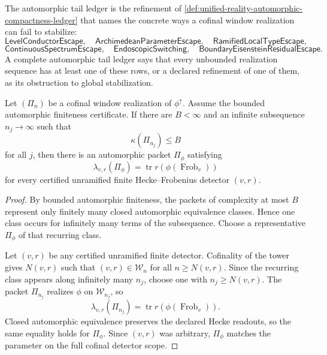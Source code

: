 \begin{definition}
\label{def:unified-reality-automorphic-tail-ledger}
The automorphic tail ledger is the refinement of
\autoref{def:unified-reality-automorphic-compactness-ledger} that names
the concrete ways a cofinal window realization can fail to stabilize:
$$
\mathsf{LevelConductorEscape},\quad
\mathsf{ArchimedeanParameterEscape},\quad
\mathsf{RamifiedLocalTypeEscape},
$$
$$
\mathsf{ContinuousSpectrumEscape},\quad
\mathsf{EndoscopicSwitching},\quad
\mathsf{BoundaryEisensteinResidualEscape}.
$$
A complete automorphic tail ledger says that every unbounded realization
sequence has at least one of these rows, or a declared refinement of one
of them, as its obstruction to global stabilization.
\end{definition}

\begin{theorem}
\label{thm:unified-reality-bounded-subsequence-global-realization}
Let $(\Pi_n)$ be a cofinal window realization of
$\phi^{\uparrow}$. Assume the bounded automorphic finiteness
certificate. If there are $B<\infty$ and an infinite subsequence
$n_j\to\infty$ such that
$$
\kappa(\Pi_{n_j})\le B
$$
for all $j$, then there is an automorphic packet $\Pi_{\phi}$ satisfying
$$
\lambda_{v,r}(\Pi_{\phi})
=
\operatorname{tr}r(\phi(\operatorname{Frob}_v))
$$
for every certified unramified finite Hecke--Frobenius detector
$(v,r)$.
\end{theorem}
\begin{proof}
By bounded automorphic finiteness, the packets of complexity at most
$B$ represent only finitely many closed automorphic equivalence classes.
Hence one class occurs for infinitely many terms of the subsequence.
Choose a representative $\Pi_{\phi}$ of that recurring class.

Let $(v,r)$ be any certified unramified finite detector. Cofinality of
the tower gives $N(v,r)$ such that $(v,r)\in\mathcal W_n$ for all
$n\ge N(v,r)$. Since the recurring class appears along infinitely many
$n_j$, choose one with $n_j\ge N(v,r)$. The packet $\Pi_{n_j}$ realizes
$\phi$ on $\mathcal W_{n_j}$, so
$$
\lambda_{v,r}(\Pi_{n_j})
=
\operatorname{tr}r(\phi(\operatorname{Frob}_v)).
$$
Closed automorphic equivalence preserves the declared Hecke readouts, so
the same equality holds for $\Pi_{\phi}$. Since $(v,r)$ was arbitrary,
$\Pi_{\phi}$ matches the parameter on the full cofinal detector scope.
\end{proof}

